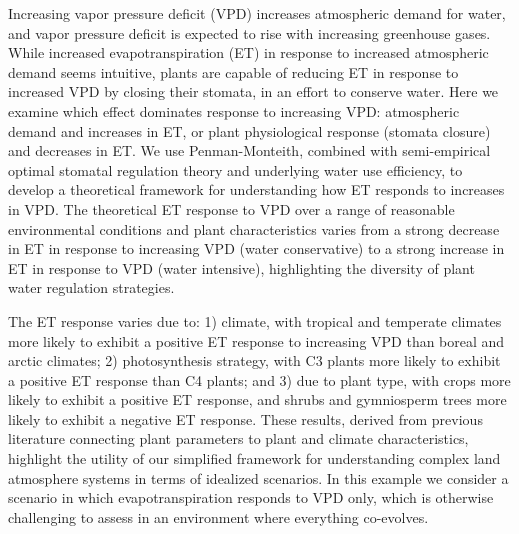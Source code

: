 Increasing vapor pressure deficit (VPD) increases atmospheric demand
for water, and vapor pressure deficit is expected to rise with
increasing greenhouse gases. While increased evapotranspiration (ET)
in response to increased atmospheric demand seems intuitive, plants
are capable of reducing ET in response to increased VPD by closing
their stomata, in an effort to conserve water. Here we examine which
effect dominates response to increasing VPD: atmospheric demand and
increases in ET, or plant physiological response (stomata closure) and
decreases in ET. We use Penman-Monteith, combined with semi-empirical
optimal stomatal regulation theory and underlying water use
efficiency, to develop a theoretical framework for understanding how
ET responds to increases in VPD. The theoretical ET response to VPD
over a range of reasonable environmental conditions and plant
characteristics varies from a strong decrease in ET in response to
increasing VPD (water conservative) to a strong increase in ET in
response to VPD (water intensive), highlighting the diversity of plant
water regulation strategies.

The ET response varies due to: 1) climate, with tropical and temperate
climates more likely to exhibit a positive ET response to increasing
VPD than boreal and arctic climates; 2) photosynthesis strategy, with
C3 plants more likely to exhibit a positive ET response than C4
plants; and 3) due to plant type, with crops more likely to exhibit a
positive ET response, and shrubs and gymniosperm trees more likely to
exhibit a negative ET response. These results, derived from previous
literature connecting plant parameters to plant and climate
characteristics, highlight the utility of our simplified framework for
understanding complex land atmosphere systems in terms of idealized
scenarios. In this example we consider a scenario in which
evapotranspiration responds to VPD only, which is otherwise
challenging to assess in an environment where everything co-evolves.
